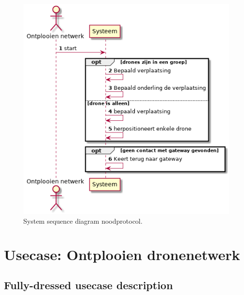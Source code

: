 \documentclass[a4paper, 11pt, oneside]{report}
\begin{document}
\begin{figure}[H]
	\begin{center}\includegraphics[height=.4\textheight]{UML/out/usecase/sequence/noodprotocol/noodprotocol.png}\end{center}
	\caption{System sequence diagram noodprotocol.}
	\label{fig:noodprotocol:systemsequence}
\end{figure}


\section[Ontplooien dronenetwerk]{Usecase: Ontplooien dronenetwerk}
\label{Usecase:ontplooien}
\subsection{Fully-dressed usecase description}
\label{Usecase:ontplooien:fully-dressed}
\end{document}
